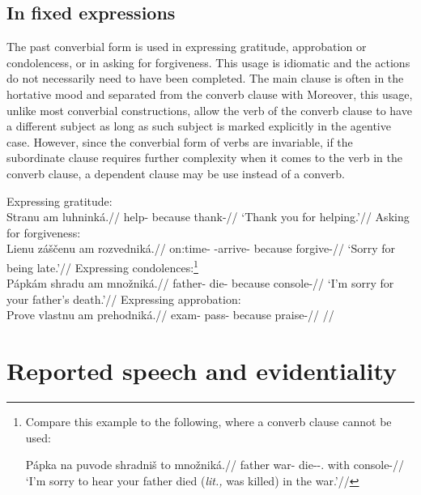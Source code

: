 \subsection{In fixed expressions}

The past converbial form is used in expressing gratitude, approbation or condolencess, or in asking for forgiveness. This usage is idiomatic and the actions do not necessarily need to have been completed. The main clause is often in the hortative mood and separated from the converb clause with  Moreover, this usage, unlike most converbial constructions, allow the verb of the converb clause to have a different subject as long as such subject is marked explicitly in the agentive case. However, since the converbial form of verbs are invariable, if the subordinate clause requires further complexity when it comes to the verb in the converb clause, a dependent  clause may be use instead of a converb.

\pex
\a Expressing gratitude:\\
\begingl
\gla Stranu am luhninká.//
\glb help- because thank-//
\glft `Thank you for helping.'//
\endgl
\a Asking for forgiveness:\\
\begingl
\gla Lienu záščenu am rozvedniká.//
\glb on:time-\Ins{} \Neg{}-arrive- because forgive-//
\glft `Sorry for being late.'//
\endgl
\a Expressing condolences:\footnote{Compare this example to the following, where a converb clause cannot be used:

\ex[lingstyle=fnex,belowexskip=-1em]
\begingl
\gla Pápka na puvode shradniš to množniká.//
\glb father \Loc{} war-\Acc{} die-\Pv{}-\Subj.\Pf{} \Rz{} with console-//
\glft `I'm sorry to hear your father died (\emph{lit.,} was killed) in the war.'//
\endgl\xe}\\
\begingl
\gla Pápkám shradu am množniká.//
\glb father- die- because console-//
\glft `I'm sorry for your father's death.'//
\endgl
\a Expressing approbation:\\
\begingl
\gla Prove vlastnu am prehodniká.//
\glb exam-\Acc{} pass- because praise-//
\glft {}//
\endgl
\xe


\section{Reported speech and evidentiality}\label{sec:reportedspeech}

